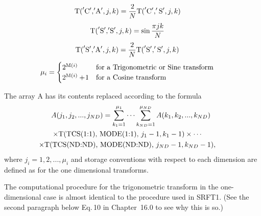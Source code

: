 \documentclass[twoside]{MATH77}
\begin{document}
\begin{equation*}
\hspace{-15pt}\text{T(}^{\prime }\text{C}^{\prime }{,}^{\prime }%
\text{A}^{\prime },j,k)=\frac 2N\text{T(}%
^{\prime }\text{C}^{\prime },^{\prime }\text{S}^{\prime },j,k)
\end{equation*}\vspace{-15pt}
\begin{equation*}
\hspace{-15pt}\text{T(}^{\prime }\text{S}^{\prime }{,}^{\prime }%
\text{S}^{\prime },j,k)=\sin \frac{\pi jk}N
\end{equation*}\vspace{-15pt}
\begin{equation*}
\hspace{-15pt}\text{T(}^{\prime }\text{S}^{\prime }{,}^{\prime }%
\text{A}^{\prime },j,k)=\frac 2N\text{T(}^{\prime }\text{S}^{\prime},%
^{\prime }\text{S}^{\prime },j,k)
\end{equation*}\vspace{-15pt}
\begin{equation*}
\hspace{-15pt}\mu _i=
\begin{cases}
2^{\text{M}(i)}& \text{for a Trigonometric or Sine transform} \\
2^{\text{M}(i)}+\!1& \text{for a Cosine transform}
\end{cases}
\end{equation*}

The array A has its contents replaced according to the formula%
\begin{multline*}
\hspace{-5pt}A(j_1,j_2,...,j_{ND})=\sum_{k_1=1}^{\mu _1}\cdots
\sum_{k_{ND}=1}^{\mu_{ND}}A(k_1,k_2,...,k_{ND})\\\hspace{-15pt}
\times \text{T(TCS(1:1), MODE(1:1), }j_1-1,k_1-1)\times \cdots\\
\hspace{-15pt}\times \text{T(TCS(ND:ND), MODE(ND:ND), }j_{ND}-1,k_{ND}-1),
\end{multline*}
where $j_i=1,2,...,\mu _i$ and storage conventions with respect to each
dimension are defined as for the one dimensional transforms.

The computational procedure for the trigonometric transform in the
one-dimensional case is almost identical to the procedure used in SRFT1.
(See the second paragraph below Eq.\,10 in Chapter~16.0 to see why this is
so.)
\end{document}
